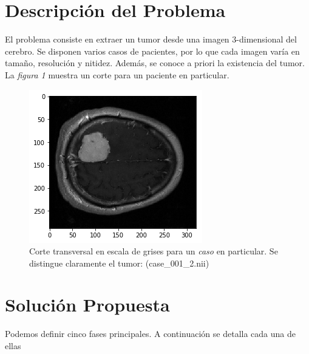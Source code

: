 \documentclass[conference]{IEEEtran}
\begin{document}
\section{Descripción del Problema}
El problema consiste en extraer un tumor desde una imagen 3-dimensional del cerebro. Se disponen varios casos de pacientes, por lo que cada imagen varía en tamaño, resolución y nitidez. Además, se conoce a priori la existencia del tumor. La \textit{figura 1} muestra un corte para un paciente en particular. 
\begin{figure}
\begin{center}
\includegraphics[scale=0.5]{img/tumor_brain.png} 
\caption{Corte transversal en escala de grises para un \textit{caso} en particular. Se distingue claramente el tumor: (case\_001\_2.nii) }
\end{center}
\end{figure}


\section{Solución Propuesta}
Podemos definir cinco fases principales. A continuación se detalla cada una de ellas
\end{document}
